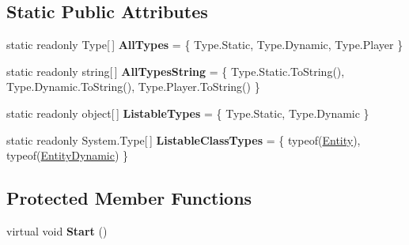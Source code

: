 \subsection*{Static Public Attributes}
\begin{DoxyCompactItemize}
\item 
\hypertarget{class_skyrates_1_1_common_1_1_entity_1_1_entity_aa2264aa396ec6c08519c50f6e872596e}{static readonly Type\mbox{[}$\,$\mbox{]} {\bfseries All\-Types} = \{ Type.\-Static, Type.\-Dynamic, Type.\-Player \}}\label{class_skyrates_1_1_common_1_1_entity_1_1_entity_aa2264aa396ec6c08519c50f6e872596e}

\item 
\hypertarget{class_skyrates_1_1_common_1_1_entity_1_1_entity_a824e2b260185ecccfa385b4a80eab46c}{static readonly string\mbox{[}$\,$\mbox{]} {\bfseries All\-Types\-String} = \{ Type.\-Static.\-To\-String(), Type.\-Dynamic.\-To\-String(), Type.\-Player.\-To\-String() \}}\label{class_skyrates_1_1_common_1_1_entity_1_1_entity_a824e2b260185ecccfa385b4a80eab46c}

\item 
\hypertarget{class_skyrates_1_1_common_1_1_entity_1_1_entity_adc830384f250e2d5f9b33229d91885ce}{static readonly object\mbox{[}$\,$\mbox{]} {\bfseries Listable\-Types} = \{ Type.\-Static, Type.\-Dynamic \}}\label{class_skyrates_1_1_common_1_1_entity_1_1_entity_adc830384f250e2d5f9b33229d91885ce}

\item 
\hypertarget{class_skyrates_1_1_common_1_1_entity_1_1_entity_a9abf8cce12c295b351195de009cfd007}{static readonly System.\-Type\mbox{[}$\,$\mbox{]} {\bfseries Listable\-Class\-Types} = \{ typeof(\hyperlink{class_skyrates_1_1_common_1_1_entity_1_1_entity}{Entity}), typeof(\hyperlink{class_skyrates_1_1_common_1_1_entity_1_1_entity_dynamic}{Entity\-Dynamic}) \}}\label{class_skyrates_1_1_common_1_1_entity_1_1_entity_a9abf8cce12c295b351195de009cfd007}

\end{DoxyCompactItemize}
\subsection*{Protected Member Functions}
\begin{DoxyCompactItemize}
\item 
\hypertarget{class_skyrates_1_1_common_1_1_entity_1_1_entity_acb5cc7450eefd4c794e9f72e0a422834}{virtual void {\bfseries Start} ()}\label{class_skyrates_1_1_common_1_1_entity_1_1_entity_acb5cc7450eefd4c794e9f72e0a422834}

\end{DoxyCompactItemize}


